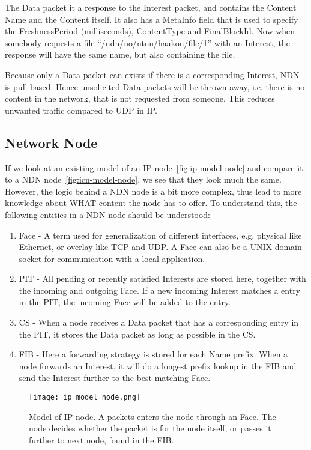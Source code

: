 The Data packet it a response to the Interest packet, and contains the Content Name and the Content itself.
It also has a MetaInfo field that is used to specify the FreshnessPeriod (milliseconds), ContentType and FinalBlockId. 
Now when somebody requests a file ``/ndn/no/ntnu/haakon/file/1'' with an Interest, the response will have the same name, but also containing the file.

Because only a Data packet can exists if there is a corresponding Interest, \gls{NDN} is pull-based.
Hence unsolicited Data packets will be thrown away, i.e. there is no content in the network, that is not requested from someone.
This reduces unwanted traffic compared to \gls{UDP} in \gls{IP}.

\subsection{Network Node}
If we look at an existing model of an \gls{IP} node~\autoref{fig:ip-model-node} and compare it to a \gls{NDN} node~\autoref{fig:icn-model-node}, we see that they look much the same.
However, the logic behind a \gls{NDN} node is a bit more complex, thus lead to more knowledge about WHAT content the node has to offer.
To understand this, the following entities in a \gls{NDN} node should be understood:
\begin{enumerate}\label{ndn-node-modules}
  \item Face - A term used for generalization of different interfaces, e.g. physical like Ethernet, or overlay like \gls{TCP} and \gls{UDP}. A Face can also be a UNIX-domain socket for communication with a local application.
  \item \gls{PIT} - All pending or recently satisfied Interests are stored here, together with the incoming and outgoing Face.
  If a new incoming Interest matches a entry in the \gls{PIT}, the incoming Face will be added to the entry. 
  \item \gls{CS} - When a node receives a Data packet that has a corresponding entry in the \gls{PIT}, it stores the Data packet as long as possible in the \gls{CS}. 
  \item \gls{FIB} - Here a forwarding strategy is stored for each Name prefix. 
  When a node forwards an Interest, it will do a longest prefix lookup in the \gls{FIB} and send the Interest further to the best matching Face.
\end{enumerate}

\begin{figure}[H]
  \centering
  \texttt{[image: ip\_model\_node.png]}
  \caption{Model of IP node. A packets enters the node through an Face. 
  The node decides whether the packet is for the node itself, or passes it further to next node, found in the FIB.}
  \label{fig:ip-model-node}
\end{figure}

